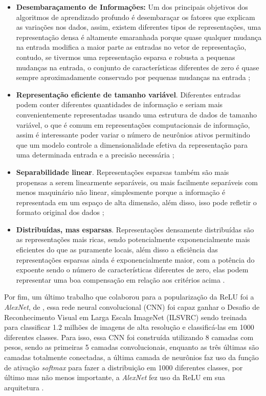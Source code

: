 \begin{itemize}
    \item \textbf{Desembaraçamento de Informações:} Um dos principais objetivos dos algoritmos de aprendizado profundo é desembaraçar os fatores que explicam as variações nos dados, assim, existem diferentes tipos de representações, uma representação densa é altamente emaranhada porque quase qualquer mudança na entrada modifica a maior parte as entradas no vetor de representação, contudo, se tivermos uma representação esparsa e robusta a pequenas mudanças na entrada, o conjunto de características diferentes de zero é quase sempre aproximadamente conservado por pequenas mudanças na entrada \parencite{Glorot};
    \item \textbf{Representação eficiente de tamanho variável}. Diferentes entradas podem conter diferentes quantidades de informação e seriam mais convenientemente representadas usando uma estrutura de dados de tamanho variável, o que é comum em representações computacionais de informação, assim é interessante poder variar o número de neurônios ativos permitindo que um modelo controle a dimensionalidade efetiva da representação para uma determinada entrada e a precisão necessária \parencite{Glorot};
    \item \textbf{Separabilidade linear}. Representações esparsas também são mais propensas a serem linearmente separáveis, ou mais facilmente separáveis com menos maquinário não linear, simplesmente porque a informação é representada em um espaço de alta dimensão, além disso, isso pode refletir o formato original dos dados \parencite{Glorot};
    \item \textbf{Distribuídas, mas esparsas}. Representações densamente distribuídas são as representações mais ricas, sendo potencialmente exponencialmente mais eficientes do que as puramente locais, além disso a eficiência das representações esparsas ainda é exponencialmente maior, com a potência do expoente sendo o número de características diferentes de zero, elas podem representar uma boa compensação em relação aos critérios acima \parencite{Glorot}.
\end{itemize}

Por fim, um último trabalho que colaborou para a popularização da ReLU foi a \textit{AlexNet}, de \textcite{AlexNet}, essa rede neural convolucional (CNN) foi capaz ganhar o Desafio de Reconhecimento Visual em Larga Escala ImageNet (ILSVRC) sendo treinada para classificar 1.2 milhões de imagens de alta resolução e classificá-las em 1000 diferentes classes. Para isso, essa CNN foi construída utilizando 8 camadas com pesos, sendo as primeiras 5 camadas convolucionais, enquanto as três últimas são camadas totalmente conectadas, a última camada de neurônios faz uso da função de ativação \textit{softmax} para fazer a distribuição em 1000 diferentes classes, por último mas não menos importante, a \textit{AlexNet} fez uso da ReLU em sua arquitetura \parencite{AlexNet}.

